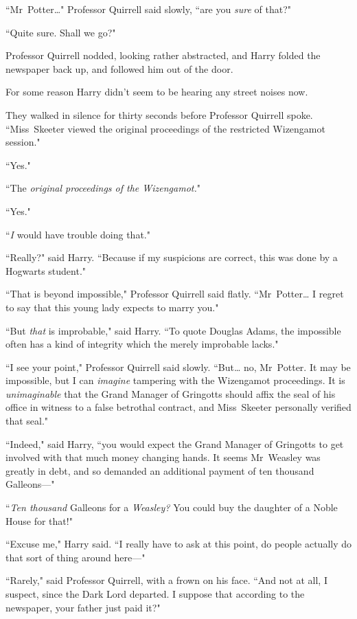 ``Mr~Potter{\ldots}" Professor Quirrell said slowly, ``are you \emph{sure} of that?"

``Quite sure. Shall we go?"

Professor Quirrell nodded, looking rather abstracted, and Harry folded the newspaper back up, and followed him out of the door.

For some reason Harry didn't seem to be hearing any street noises now.

They walked in silence for thirty seconds before Professor Quirrell spoke. ``Miss~Skeeter viewed the original proceedings of the restricted Wizengamot session."

``Yes."

``The \emph{original proceedings of the Wizengamot.}"

``Yes."

``\emph{I} would have trouble doing that."

``Really?" said Harry. ``Because if my suspicions are correct, this was done by a Hogwarts student."

``That is beyond impossible," Professor Quirrell said flatly. ``Mr~Potter{\ldots} I regret to say that this young lady expects to marry you."

``But \emph{that} is improbable," said Harry. ``To quote Douglas Adams, the impossible often has a kind of integrity which the merely improbable lacks."

``I see your point," Professor Quirrell said slowly. ``But{\ldots} no, Mr~Potter. It may be impossible, but I can \emph{imagine} tampering with the Wizengamot proceedings. It is \emph{unimaginable} that the Grand Manager of Gringotts should affix the seal of his office in witness to a false betrothal contract, and Miss~Skeeter personally verified that seal."

``Indeed," said Harry, ``you would expect the Grand Manager of Gringotts to get involved with that much money changing hands. It seems Mr~Weasley was greatly in debt, and so demanded an additional payment of ten thousand Galleons—"

``\emph{Ten thousand} Galleons for a \emph{Weasley?} You could buy the daughter of a Noble House for that!"

``Excuse me," Harry said. ``I really have to ask at this point, do people actually do that sort of thing around here—"

``Rarely," said Professor Quirrell, with a frown on his face. ``And not at all, I suspect, since the Dark Lord departed. I suppose that according to the newspaper, your father just paid it?"


